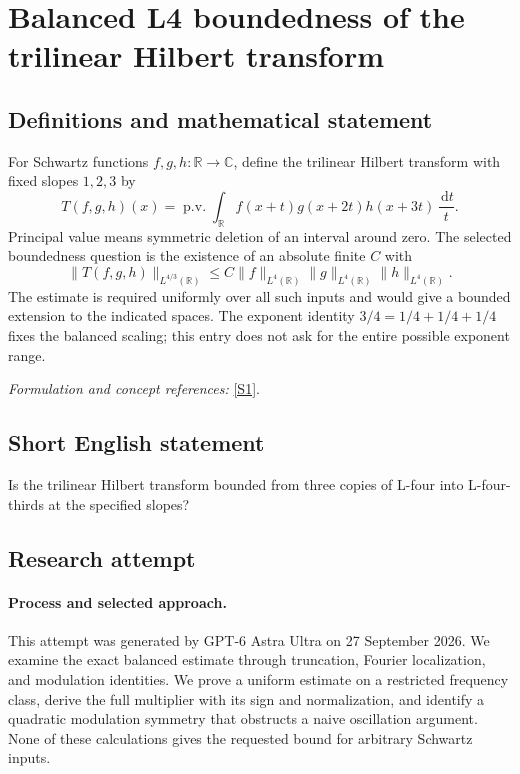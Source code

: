 \documentclass[11pt]{article}
\begin{document}
\section*{\texorpdfstring{Balanced L4 boundedness of the trilinear Hilbert transform}{Balanced L4 boundedness of the trilinear Hilbert transform}}\label{444}
\subsection{Definitions and mathematical statement}
For Schwartz functions $f,g,h:{\mathbb{R}}\to{\mathbb{C}}$, define the trilinear Hilbert transform with fixed slopes $1,2,3$ by
\[
 T(f,g,h)(x)=\operatorname{p.v.}\int_{{\mathbb{R}}}
 f(x+t)g(x+2t)h(x+3t)\,\frac{{\,\mathrm{d}} t}{t}.
\]
Principal value means symmetric deletion of an interval around zero. The selected boundedness question is the existence of an absolute finite $C$ with
\[
 \|T(f,g,h)\|_{L^{4/3}({\mathbb{R}})}
 \le C\|f\|_{L^4({\mathbb{R}})}\|g\|_{L^4({\mathbb{R}})}\|h\|_{L^4({\mathbb{R}})}.
\]
The estimate is required uniformly over all such inputs and would give a bounded extension to the indicated spaces. The exponent identity $3/4=1/4+1/4+1/4$ fixes the balanced scaling; this entry does not ask for the entire possible exponent range.
\par\smallskip\textit{Formulation and concept references:} \href{https://terrytao.wordpress.com/2007/05/10/open-question-boundedness-of-the-trilinear-hilbert-transform/}{[S1]}.

\subsection{Short English statement}
Is the trilinear Hilbert transform bounded from three copies of L-four into L-four-thirds at the specified slopes?
\subsection{Research attempt}
\paragraph{Process and selected approach.}
This attempt was generated by GPT-6 Astra Ultra on 27 September 2026. We examine the exact balanced estimate through truncation, Fourier localization, and modulation identities. We prove a uniform estimate on a restricted frequency class, derive the full multiplier with its sign and normalization, and identify a quadratic modulation symmetry that obstructs a naive oscillation argument. None of these calculations gives the requested bound for arbitrary Schwartz inputs.
\end{document}
